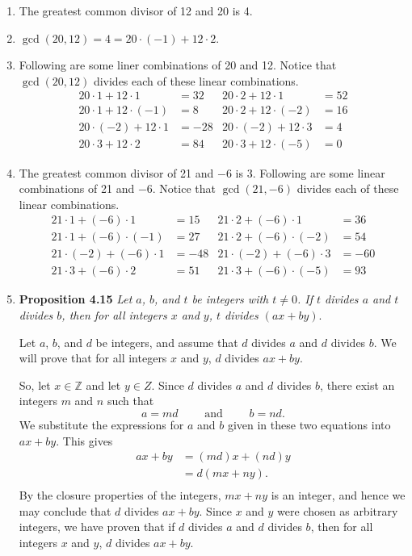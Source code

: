 \documentclass[11pt]{article}
\begin{document}
\begin{enumerate}
\item The greatest common divisor of 12 and 20 is 4.

\item $\gcd(20, 12) = 4 = 20\cdot (-1) + 12 \cdot 2$.

\item Following are some liner combinations of 20 and 12. Notice that $\gcd(20, 12)$ divides each of these linear combinations.
\begin{align*}
20 \cdot 1 + 12 \cdot 1 &= 32  & 20 \cdot 2 + 12 \cdot 1 &= 52 \\
20 \cdot 1 + 12 \cdot (-1) &= 8 & 20 \cdot 2 + 12 \cdot (-2) &= 16 \\
20 \cdot (-2) + 12 \cdot 1 &= -28 & 20 \cdot (-2) + 12 \cdot 3 &= 4 \\
20 \cdot 3 + 12 \cdot 2 &= 84  &  20 \cdot 3 + 12 \cdot (-5) &= 0
\end{align*}

\item The greatest common divisor of 21 and $-6$ is 3.  Following are some linear combinations of 21 and $-6$.  Notice that $\gcd(21, -6)$ divides each of these linear combinations.
\begin{align*}
21 \cdot 1 + (-6) \cdot 1 &= 15  & 21 \cdot 2 + (-6) \cdot 1 &= 36 \\
21 \cdot 1 + (-6) \cdot (-1) &= 27 & 21 \cdot 2 + (-6) \cdot (-2) &= 54 \\
21 \cdot (-2) + (-6) \cdot 1 &= -48 & 21 \cdot (-2) + (-6) \cdot 3 &= -60 \\
21 \cdot 3 + (-6) \cdot 2 &= 51  &  21 \cdot 3 + (-6) \cdot (-5) &= 93
\end{align*}

\item \textbf{Proposition 4.15} \emph{Let $a$, $b$, and $t$ be integers with $t \ne 0$.  If $t$ divides $a$ and $t$ divides $b$, then for all integers $x$ and $y$, $t$ divides 
$(ax + by)$}.

\begin{myproof}
Let $a$, $b$, and  $d$  be integers, and assume that $d$  divides  $a$  and  $d$  divides  $b$.  We will prove that for all integers  $x$  and  $y$,  $d$  divides  $ax + by$.

So, let  $x \in \mathbb{Z}$ and let  $y \in Z$.  Since  $d$  divides  $a$ and $d$ divides $b$, there exist an integers  $m$ and $n$  such that
\[
a = md \qquad \text{ and } \qquad b = nd.
\]
We substitute the expressions for  $a$  and  $b$  given in these two equations into  $ax + by$.  This gives
\[
\begin{aligned}
  ax + by &= \left( {md} \right)x + \left( {nd} \right)y \\ 
          &= d\left( {mx + ny} \right). \\ 
\end{aligned} 
\]
By the closure properties of the integers,  $mx + ny$ is an integer, and hence we may conclude that  $d$  divides  $ax + by$.  Since  $x$  and  $y$  were chosen as arbitrary integers, we have proven that if  $d$  divides  $a$  and  $d$  divides  $b$, then for all integers  $x$  and  $y$,  $d$  divides  $ax + by$.
\end{myproof}


\end{enumerate}
\end{document}
